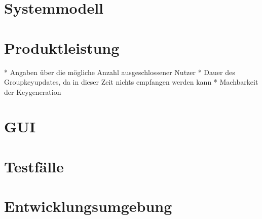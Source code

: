 \documentclass[a4paper,10pt]{article}
\begin{document}
\section{Systemmodell}



\section{Produktleistung}
* Angaben über die mögliche Anzahl ausgeschlossener Nutzer
* Dauer des Groupkeyupdates, da in dieser Zeit nichts empfangen werden kann
* Machbarkeit der Keygeneration

\section{GUI}

\section{Testfälle}

\section{Entwicklungsumgebung}

\clearpage


{}

\end{document}
